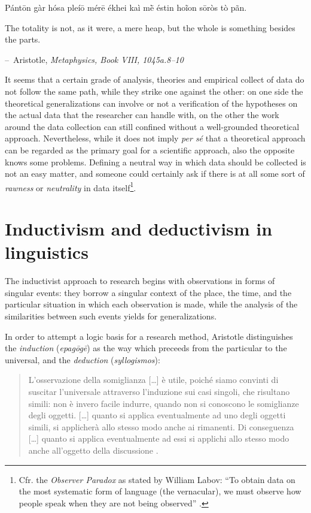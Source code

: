 \documentclass[
  a4paper,
  twoside,
  12pt,
  chapterprefix=false,
  bibliography=totocnumbered,
  listof=flat]{scrbook}
\makeatletter
\newenvironment{chapquote}[2][2em]
  {\setlength{\@tempdima}{#1}%
   \def\chapquote@author{#2}%
   \parshape 1 \@tempdima \dimexpr\textwidth-2\@tempdima\relax%
   \itshape}
  {\par\normalfont\hfill--\ \chapquote@author\hspace*{\@tempdima}\par\vspace{4em}}
\makeatother
\begin{document}
\begin{chapquote}{Aristotle, \textit{Metaphysics, Book VIII, 1045a.8–10}}
\par{Pántōn gàr hósa pleíō mérē ékhei kaì mḕ éstin hoĩon sōròs tò pãn.}\\ 
\par{\noindent The totality is not, as it were, a mere heap, but the whole is something besides the parts.}
\end{chapquote}

\noindent It seems that a certain grade of analysis, theories and empirical collect of data do not follow the same path, while they strike one against the other: on one side the theoretical generalizations can involve or not a verification of the hypotheses on the actual data that the researcher can handle with, on the other the work around the data collection can still confined without a well-grounded theoretical approach.
Nevertheless, while it does not imply \emph{per sé} that a theoretical approach can be regarded as the primary goal for a scientific approach, also the opposite knows some problems. Defining a neutral way in which data should be collected is not an easy matter, and someone could certainly ask if there is at all some sort of \emph{rawness} or \emph{neutrality} in data itself\footnote{Cfr. the \emph{Observer Paradox} as stated by William Labov: ``To obtain data on the most systematic form of language (the vernacular), we must observe how people speak when they are not being observed'' \citep[xvii]{labov1973}.}.

\hypertarget{inductivism-and-deductivism-in-linguistics}{%
\section{Inductivism and deductivism in linguistics}\label{inductivism-and-deductivism-in-linguistics}}

The inductivist approach to research begins with observations in forms of singular events: they borrow a singular context of the place, the time, and the particular situation in which each observation is made, while the analysis of the similarities between such events yields for generalizations.

In order to attempt a logic basis for a research method, Aristotle distinguishes the \emph{induction} (\emph{epagōgē}) as the way which preceeds from the particular to the universal, and the \emph{deduction} (\emph{syllogismos}):

\begin{quote}
L'osservazione della somiglianza {[}\ldots{]} è utile, poiché siamo convinti di suscitar l'universale attraverso l'induzione sui casi singoli, che risultano simili: non è invero facile indurre, quando non si conoscono le somiglianze degli oggetti. {[}\ldots{]} quanto si applica eventualmente ad uno degli oggetti simili, si applicherà allo stesso modo anche ai rimanenti. Di conseguenza {[}\ldots{]} quanto si applica eventualmente ad essi si applichi allo stesso modo anche all'oggetto della discussione \citep[ \emph{Topici} 1.18.108b]{aristoteleOrganon}.
\end{quote}
\end{document}
